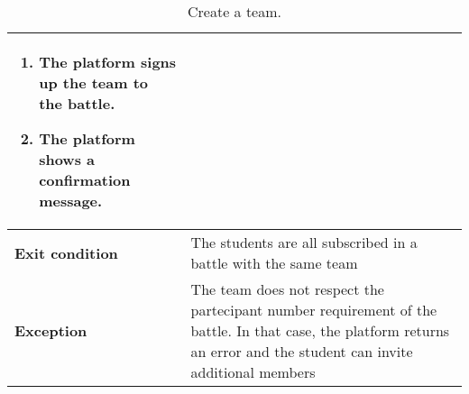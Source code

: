 \begin{enumerate}[label=\textbf{UC\arabic*}:,leftmargin=1.3cm]
\begin{table}[H]
\begin{tabular}{|l|p{11.9cm}|}
\begin{enumerate}[label=\arabic*.]
                      \item The platform signs up the team to the battle.
                      \item The platform shows a confirmation message.
                  \end{enumerate}                    \\\hline
                  \textbf{Exit condition}  & The students are all subscribed in a battle with the same team              \\\hline
                  \textbf{Exception}       & The team does not respect the partecipant number requirement of the battle.
                  In that case, the platform returns an error and the student can invite additional members              \\\hline
              \end{tabular}
              \caption{Create a team.}
              \label{table:Create a team}
          \end{table}
          \pagebreak


\end{enumerate}
